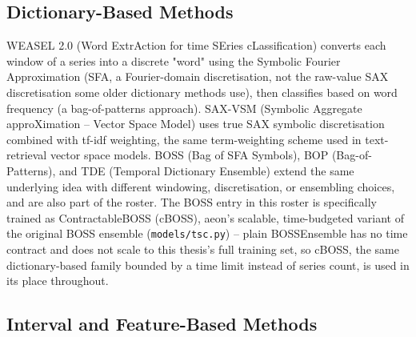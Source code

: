 \subsection{Dictionary-Based Methods}

WEASEL 2.0 (Word ExtrAction for time SEries cLassification) \citep{schafer2023weasel2} converts each window of a series into a discrete "word" using the Symbolic Fourier Approximation (SFA, a Fourier-domain discretisation, not the raw-value SAX discretisation some older dictionary methods use), then classifies based on word frequency (a bag-of-patterns approach). SAX-VSM (Symbolic Aggregate approXimation -- Vector Space Model) \citep{senin2013saxvsm} uses true SAX symbolic discretisation combined with tf-idf weighting, the same term-weighting scheme used in text-retrieval vector space models. BOSS (Bag of SFA Symbols), BOP (Bag-of-Patterns), and TDE (Temporal Dictionary Ensemble) extend the same underlying idea with different windowing, discretisation, or ensembling choices, and are also part of the roster. The BOSS entry in this roster is specifically trained as ContractableBOSS (cBOSS), aeon's scalable, time-budgeted variant of the original BOSS ensemble (\texttt{models/tsc.py}) -- plain BOSSEnsemble has no time contract and does not scale to this thesis's full training set, so cBOSS, the same dictionary-based family bounded by a time limit instead of series count, is used in its place throughout.

\subsection{Interval and Feature-Based Methods}

